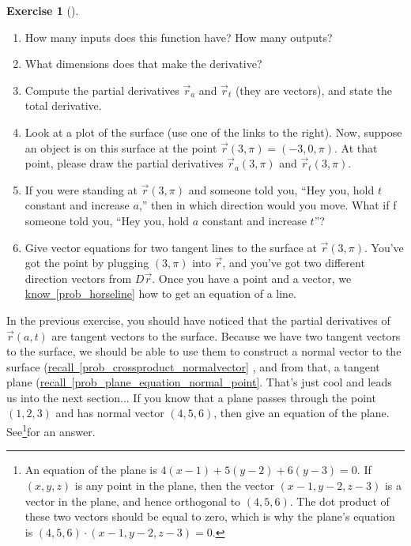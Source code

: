 \documentclass[10pt,]{book}
\theoremstyle{plain}
\theoremstyle{definition}
\theoremstyle{definition}
\theoremstyle{definition}
\theoremstyle{definition}
\newtheorem{exploration}[project]{Exercise}
\theoremstyle{definition}
\numberwithin{equation}{section}
\begin{document}
\begin{exploration}[]\label{exploration-140}
\leavevmode%
\begin{enumerate}[font=\bfseries,label=(\alph*),ref=\alph*]
\item\label{task-300} How many inputs does this function have? How many outputs?%
\item\label{task-301} What dimensions does that make the derivative?%
\item\label{task-302} Compute the partial derivatives \(\vec r_a\) and \(\vec r_t\) (they are vectors), and state the total derivative.%
\item\label{task-303} Look at a plot of the surface (use one of the links to the right). Now, suppose an object is on this surface at the point \(\vec r(3,\pi) = (-3,0,\pi)\). At that point, please draw the partial derivatives \(\vec r_a(3,\pi)\) and \(\vec r_t(3,\pi)\). %
\item\label{task-304} If you were standing at \(\vec r(3,\pi)\) and someone told you, ``Hey you, hold \(t\) constant and increase \(a\),'' then in which direction would you move. What if f someone told you, ``Hey you, hold \(a\) constant and increase \(t\)''?%
\item\label{task-305} Give vector equations for two tangent lines to the surface at \(\vec r(3,\pi)\). You've got the point by plugging \((3,\pi)\) into \(\vec r\), and you've got two different direction vectors from \(D\vec r\). Once you have a point and a vector, we \hyperref[prob_horseline]{know~\ref{prob_horseline}} how to get an equation of a line.%
%
\end{enumerate}
\end{exploration}
In the previous exercise, you should have noticed that the partial derivatives of \(\vec r(a,t)\) are tangent vectors to the surface. Because we have two tangent vectors to the surface, we should be able to use them to construct a normal vector to the surface (\hyperref[prob_crossproduct_normalvector]{recall~\ref{prob_crossproduct_normalvector}} , and from that, a tangent plane (\hyperref[prob_plane_equation_normal_point]{recall~\ref{prob_plane_equation_normal_point}}. That's just cool and leads us into the next section...%
If you know that a plane passes through the point \((1,2,3)\) and has normal vector \((4,5,6)\), then give an equation of the plane. See\footnote{An equation of the plane is \(4(x-1)+5(y-2)+6(y-3)=0\). If \((x,y,z)\) is any point in the plane, then the vector \((x-1,y-2,z-3)\) is a vector in the plane, and hence orthogonal to \((4,5,6)\). The dot product of these two vectors should be equal to zero, which is why the plane's equation is \((4,5,6)\cdot (x-1,y-2,z-3)=0\).\label{fn-2}}for an answer.%
\end{document}

